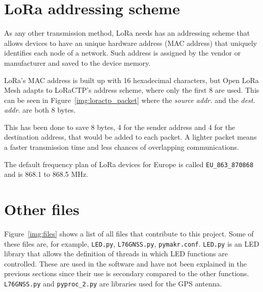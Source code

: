 		
		
		
		
		\section{LoRa addressing scheme}\label{subsec:lora_addressing}
	
			As any other transmission method, LoRa needs has an addressing scheme that allows devices to have an unique hardware address (MAC address) that uniquely identifies each node of a network.
			Such address is assigned by the vendor or manufacturer and saved to the device memory. 
			
			LoRa's MAC address is built up with 16 hexadecimal characters, but Open LoRa Mesh adapts to LoRaCTP's address scheme, where only the first 8 are used.
			This can be seen in Figure~\ref{img:loractp_packet} where the \textit{source addr.} and the \textit{dest. addr.} are both 8 bytes.
			
			This has been done to save 8 bytes, 4 for the sender address and 4 for the destination address, that would be added to each packet.
			A lighter packet means a faster transmission time and less chances of overlapping communications.
			
			The default frequency plan of LoRa devices for Europe is called \texttt{EU\_863\_870868} and is 868.1 to 868.5 MHz.
		
	\section{Other files}
	
		Figure~\ref{img:files} shows a list of all files that contribute to this project.
		Some of these files are, for example, \texttt{LED.py}, \texttt{L76GNSS.py}, \texttt{pymakr.conf}.
		\texttt{LED.py} is an LED library that allows the definition of threads in which LED functions are controlled.
		These are used in the software and have not been explained in the previous sections since their use is secondary compared to the other functions.
		\texttt{L76GNSS.py} and \texttt{pyproc\_2.py} are libraries used for the GPS antenna.
		
